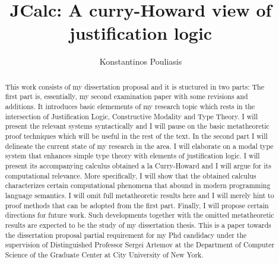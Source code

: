 \documentclass[12pt]{report}
\title{JCalc: A curry-Howard view of justification logic}
\author{Konstantinos Pouliasis}
\begin{document}
\maketitle


\begin{abstract}
This work consists of my dissertation proposal and  it is stuctured in two parts: 
The first part is, essentially, my second examination paper with some revisions and additions. It  introduces basic elemements of my research topic which rests in 
the intersection of Justification Logic, Constructive Modality and Type Theory. I will present the relevant systems syntactically and I will pause on the basic metatheoretic
proof techniques which will be useful in the rest of the text.
In the second part I will delineate the current state of my research in the area.
I will elaborate on a modal type system that enhances simple type theory with elements of justification logic. I will present its accompanying calculus 
 obtained  a la Curry-Howard and I will argue for its computational relevance. More specifically, I will show  
that the obtained calculus characterizes  certain computational phenomena that abound in modern programming language semantics. 
I will omit full metatheoretic
results here and  I will merely hint to  proof methods that can be adopted from the first part. Finally,  I will propose certain
directions for future work. Such developments together with the omitted metatheoretic results are expected to be the study of my dissertation thesis.
This is a  paper towards the dissertation proposal partial requirement  for my Phd candidacy under the supervision of Distinguished Professor Sergei Artemov at the Department of Computer Science of the Graduate Center at City University of New York.
\end{abstract}
\tableofcontents

%
%







\nocite{Pfenning2009a, Pfenning2009b}




\end{document}
